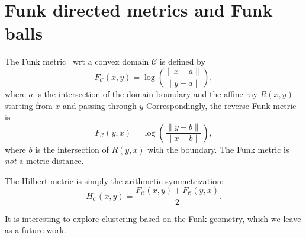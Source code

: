 \documentclass[graybox]{svmult}
\def\calC{\mathcal{C}}
\begin{document}
\section{Funk directed metrics and Funk balls}

The Funk metric~\cite{FunkHilbert-2014}
wrt a convex domain $\calC$ is defined by
$$
F_\calC(x,y) = \log\left( \frac{\|x-a\|}{\|y-a\|} \right),
$$
where $a$ is the intersection of 
the domain boundary and the affine ray $R(x,y)$
starting from $x$ and passing through $y$
Correspondingly, the reverse Funk metric is
$$
F_\calC(y,x) = \log\left( \frac{\|y-b\|}{\|x-b\|} \right),
$$
where $b$ is the intersection of $R(y,x)$ with the boundary.
The Funk metric is \emph{not} a metric distance.

The Hilbert metric is simply the arithmetic symmetrization:
$$
H_\calC(x,y)=\frac{F_\calC(x,y)+F_\calC(y,x)}{2}.
$$

It is interesting to explore clustering based on the Funk geometry,
which we leave as a future work.

\end{document}
